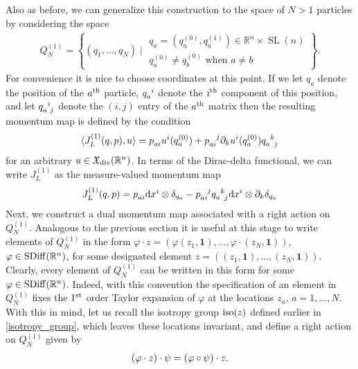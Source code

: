\documentclass[12pt]{amsart}
\newcommand{\R}{\ensuremath{\mathbb{R}}}
\newcommand{\dx}{\ensuremath{\textrm{d}x}}
\DeclareMathOperator{\SL}{SL}
\begin{document}
  Also as before, we can generalize this construction to the space of
  $N > 1$ particles by considering the space
  \begin{align*}
    Q^{(1)}_N = \left\{  ( q_1 , \dots, q_N ) \mid
      \begin{array}{c}
        q_a = (q^{(0)}_a,q^{(1)}_a) \in \R^n \times \SL(n) \\
        q^{(0)}_a \neq q^{(0)}_b \text{ when } a \neq b
      \end{array} \right\}.
  \end{align*}
  For convenience it is nice to choose coordinates at this point.
  If we let $q_a$ denote the position of the $a^{\rm th}$ particle,
  $q\indices{_a^i}$ denote the $i^{\rm th}$ component of this position,
  and let $q\indices{_a^i_j}$ denote the $(i,j)$ entry of the $a^{\rm th}$
  matrix then the resulting momentum map is defined by the condition
  \begin{align*}
    \langle J_L^{(1)}(q,p) , u \rangle
    = p\indices{_a_i} u^i(q^{(0)}_a) + p\indices{_a_i^j} \partial_k u^i(q^{(0)}_a) q\indices{_a^k_j}
  \end{align*}
  for an arbitrary $u \in \mathfrak{X}_{\rm div}(\R^n)$.
  In terms of the Dirac-delta functional, we can write $J_L^{(1)}$ as the measure-valued momentum map
  \begin{align*}
    J_L^{(1)}(q, p)
    = p\indices{_a_i} \dx^i \otimes \delta_{q_a}
     -p\indices{_a_i^j} q\indices{_a^k_j} \dx^i \otimes \partial_k \delta_{q_a}
  \end{align*}
  Next, we construct a dual momentum map associated with a right action on $Q_N^{(1)}$. Analogous to the previous section  it is useful at this stage to write elements of $Q_N^{(1)}$ in the form $ \varphi \cdot z = (\varphi (z_1, {\mathbf{1}}), \ldots, \varphi \cdot (z_N , \mathbf{1}))$, $\varphi \in {\rm SDiff}(\mathbb{R}^n)$, for some designated element $ z=( (z_1, \mathbf{1}), \ldots, (z_N, \mathbf{1}))$. Clearly, every element of $Q_N^{(1)}$ can be written in this form for some  $\varphi \in {\rm SDiff}(\mathbb{R}^n)$. Indeed, with this convention the specification of an element in $Q_N^{(1)}$ fixes the $1^{\rm st}$ order Taylor expansion of $\varphi$ at the locations $z_a$, $a = 1, \ldots, N$. With this in mind, let us recall the isotropy group ${\rm iso}(z)$ defined earlier in \eqref{isotropy_group}, which leaves these locations invariant, and define a right action on  $Q_N^{(1)}$ given by 
\begin{align}
	 (\varphi \cdot z) \cdot \psi  = (\varphi \circ \psi) \cdot z. \notag
	 \end{align}
\end{document}
